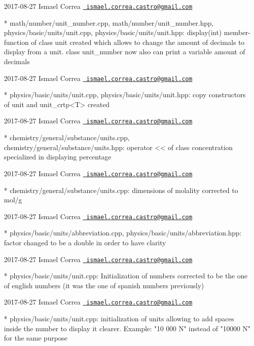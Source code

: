  2017-\/08-\/27 Ismael Correa \href{mailto:ismael.correa.castro@gmail.com}{\texttt{ ismael.\+correa.\+castro@gmail.\+com}} \begin{DoxyVerb}* math/number/unit_number.cpp, math/number/unit_number.hpp,
physics/basic/units/unit.cpp, physics/basic/units/unit.hpp: 
display(int) member-function of class unit created which allows to
change the amount of decimals to display from a unit. class
unit_number now also can print a variable amount of decimals
\end{DoxyVerb}
 2017-\/08-\/27 Ismael Correa \href{mailto:ismael.correa.castro@gmail.com}{\texttt{ ismael.\+correa.\+castro@gmail.\+com}} \begin{DoxyVerb}* physics/basic/units/unit.cpp, physics/basic/units/unit.hpp: copy
constructors of unit and unit_crtp<T> created
\end{DoxyVerb}
 2017-\/08-\/27 Ismael Correa \href{mailto:ismael.correa.castro@gmail.com}{\texttt{ ismael.\+correa.\+castro@gmail.\+com}} \begin{DoxyVerb}* chemistry/general/substance/units.cpp,
chemistry/general/substance/units.hpp: operator << of class
concentration specialized in displaying percentage
\end{DoxyVerb}
 2017-\/08-\/27 Ismael Correa \href{mailto:ismael.correa.castro@gmail.com}{\texttt{ ismael.\+correa.\+castro@gmail.\+com}} \begin{DoxyVerb}* chemistry/general/substance/units.cpp: dimensions of molality
corrected to mol/g
\end{DoxyVerb}
 2017-\/08-\/27 Ismael Correa \href{mailto:ismael.correa.castro@gmail.com}{\texttt{ ismael.\+correa.\+castro@gmail.\+com}} \begin{DoxyVerb}* physics/basic/units/abbreviation.cpp,
physics/basic/units/abbreviation.hpp: factor changed to be a double
in order to have clarity
\end{DoxyVerb}
 2017-\/08-\/27 Ismael Correa \href{mailto:ismael.correa.castro@gmail.com}{\texttt{ ismael.\+correa.\+castro@gmail.\+com}} \begin{DoxyVerb}* physics/basic/units/unit.cpp: Initialization of numbers corrected
to be the one of english numbers (it was the one of spanish numbers
previously)
\end{DoxyVerb}
 2017-\/08-\/27 Ismael Correa \href{mailto:ismael.correa.castro@gmail.com}{\texttt{ ismael.\+correa.\+castro@gmail.\+com}} \begin{DoxyVerb}* physics/basic/units/unit.cpp: initialization of units allowing to
add spaces inside the number to display it clearer. Example: "10 000
N" instead of "10000 N" for the same purpose
\end{DoxyVerb}
